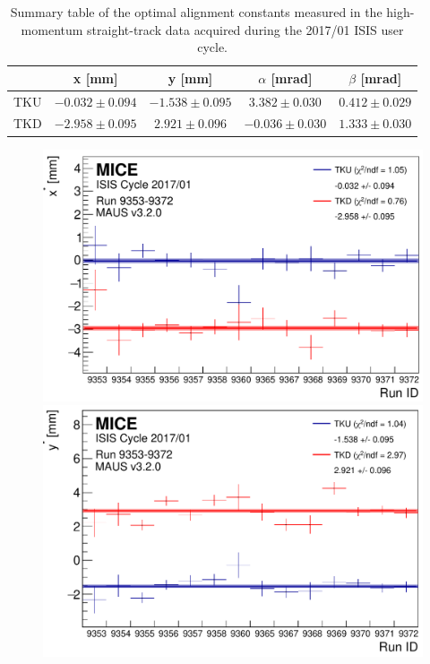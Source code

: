 \begin{table}[ht!]
	\centering
		\begin{tabular}{l|c|c|c|c}
			& x [mm] & y [mm] & $\alpha$ [mrad] & $\beta$ [mrad] \\
			\hline
			TKU & $-0.032\pm0.094$ & $-1.538\pm0.095$ & $ 3.382\pm0.030$ & $0.412\pm0.029$ \\
			TKD & $-2.958\pm0.095$ & $ 2.921\pm0.096$ & $-0.036\pm0.030$ & $1.333\pm0.030$
		\end{tabular}
	\caption{Summary table of the optimal alignment constants measured in the high-momentum straight-track data acquired during the 2017/01 ISIS user cycle.}
	\label{tab:201701_constants}
\end{table}

\begin{figure} [!htb]
	\centering
	\begin{minipage}[b]{.45\textwidth}
		\centering
		\includegraphics[width=\textwidth]{data_final/x_bestfit_edit.pdf}
	\end{minipage}
	\hfill
	\begin{minipage}[b]{.45\textwidth}
		\centering
		\includegraphics[width=\textwidth]{data_final/y_bestfit_edit.pdf}
	\end{minipage}
	

\end{figure}
